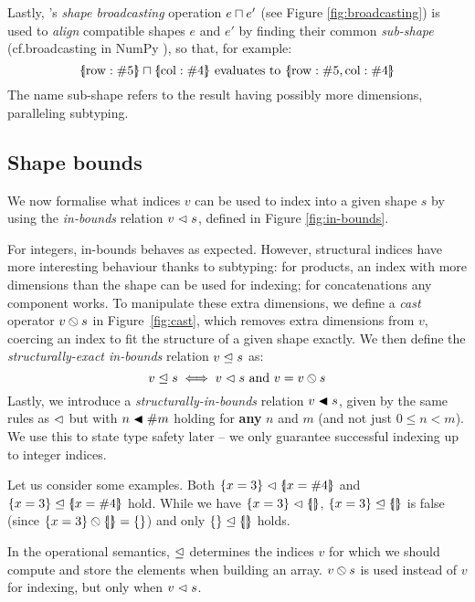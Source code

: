 Lastly, \starr{}'s \textit{shape broadcasting}
operation $e \sqcap e'$ (see Figure \ref{fig:broadcasting}) is used to \textit{align} compatible shapes $e$ and $e'$ by finding their common \emph{sub-shape} (cf.\@ broadcasting in NumPy \cite{numpy}), so that, for example:
$$ \sproductval{\mathrm{row}: \ssized 5} \broadcast \sproductval{\mathrm{col}: \ssized 4} \text{ evaluates to } \sproductval{\mathrm{row}: \ssized 5, \mathrm{col}: \ssized 4}$$
The name sub-shape refers to the result having possibly more dimensions, paralleling subtyping.

\subsection{Shape bounds}
\label{subsec:shape-bounds}

We now formalise what indices $v$ can be used to index into a given shape $s$ by using the \emph{in-bounds} relation $v \vartriangleleft s$, defined in Figure \ref{fig:in-bounds}.

For integers, in-bounds behaves as expected. 
However, structural indices have more interesting behaviour thanks to subtyping:
for products, an index with more dimensions than the shape can be used for indexing; for concatenations any component works. 
To manipulate these extra dimensions, we define a \emph{cast} operator ${v} \obslash {s}$ in Figure~\ref{fig:cast}, which removes extra dimensions from $v$, coercing an index to fit the structure of a given shape exactly.
We then define the \emph{structurally-exact in-bounds} relation $v \trianglelefteq s$ as:
$$ v \trianglelefteq s \iff v \vartriangleleft s \text{ and } v = {v} \obslash {s}$$
Lastly, we introduce a \emph{structurally-in-bounds} relation $v \blacktriangleleft s$, given by the same rules as $\vartriangleleft$ but with $n \blacktriangleleft \#{m}$ holding for \textbf{any} $n$ and $m$ (and not just $0 \le n < m$). We use this to state type safety later -- we only guarantee successful indexing up to integer indices.

Let us consider some examples. Both $\srecordval{ x = 3 } \inbs \sproductval{x = \ssize 4}$
and $\srecordval{ x = 3 } \inbsp \sproductval{x = \ssize 4}$ hold.
While we have $\srecordval{x = 3} \inbs \sproductval{}$, $\srecordval{x = 3} \inbsp \sproductval{}$ is false (since $\scast{\srecordval{x = 3}}{\sproductval{}} = \srecordval{}$) and only $\srecordval{} \inbsp \sproductval{}$ holds.

In the operational semantics, $\trianglelefteq$ determines the indices $v$ for which we should compute and store the elements when building an array. ${v} \obslash {s}$ is used instead of $v$ for indexing, but only when $v \vartriangleleft s$.

